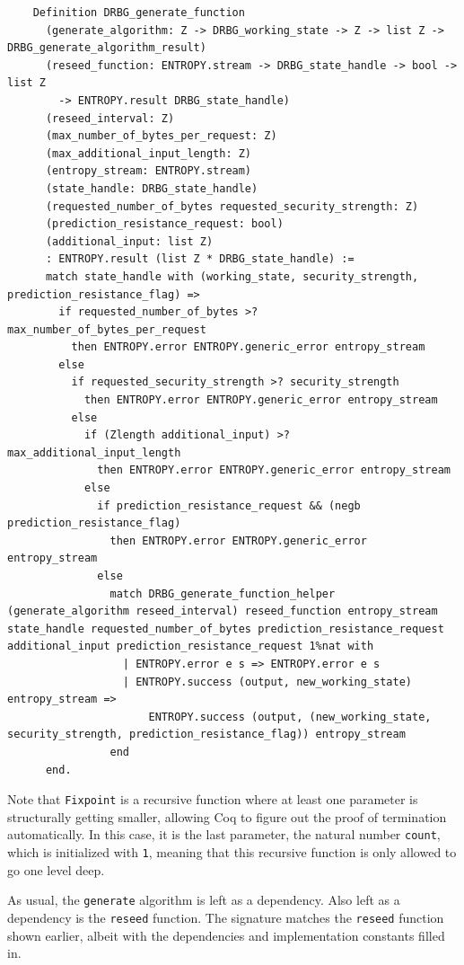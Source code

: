 \documentclass[pageno]{jpaper}
\begin{document}
\begin{lstlisting}
    Definition DRBG_generate_function
      (generate_algorithm: Z -> DRBG_working_state -> Z -> list Z -> DRBG_generate_algorithm_result)
      (reseed_function: ENTROPY.stream -> DRBG_state_handle -> bool -> list Z
        -> ENTROPY.result DRBG_state_handle)
      (reseed_interval: Z)
      (max_number_of_bytes_per_request: Z)
      (max_additional_input_length: Z)
      (entropy_stream: ENTROPY.stream)
      (state_handle: DRBG_state_handle)
      (requested_number_of_bytes requested_security_strength: Z)
      (prediction_resistance_request: bool)
      (additional_input: list Z)
      : ENTROPY.result (list Z * DRBG_state_handle) :=
      match state_handle with (working_state, security_strength, prediction_resistance_flag) =>
        if requested_number_of_bytes >? max_number_of_bytes_per_request
          then ENTROPY.error ENTROPY.generic_error entropy_stream
        else
          if requested_security_strength >? security_strength
            then ENTROPY.error ENTROPY.generic_error entropy_stream
          else
            if (Zlength additional_input) >? max_additional_input_length
              then ENTROPY.error ENTROPY.generic_error entropy_stream
            else
              if prediction_resistance_request && (negb prediction_resistance_flag)
                then ENTROPY.error ENTROPY.generic_error entropy_stream
              else
                match DRBG_generate_function_helper (generate_algorithm reseed_interval) reseed_function entropy_stream state_handle requested_number_of_bytes prediction_resistance_request additional_input prediction_resistance_request 1%nat with
                  | ENTROPY.error e s => ENTROPY.error e s
                  | ENTROPY.success (output, new_working_state) entropy_stream =>
                      ENTROPY.success (output, (new_working_state, security_strength, prediction_resistance_flag)) entropy_stream
                end
      end.
\end{lstlisting}


Note that \lstinline{Fixpoint} is a recursive function where at least one parameter is structurally getting smaller, allowing Coq to figure out the proof of termination automatically. In this case, it is the last parameter, the natural number \lstinline{count}, which is initialized with \lstinline{1}, meaning that this recursive function is only allowed to go one level deep.

As usual, the \lstinline{generate} algorithm is left as a dependency. Also left as a dependency is the \lstinline{reseed} function. The signature matches the \lstinline{reseed} function shown earlier, albeit with the dependencies and implementation constants filled in.
\end{document}
